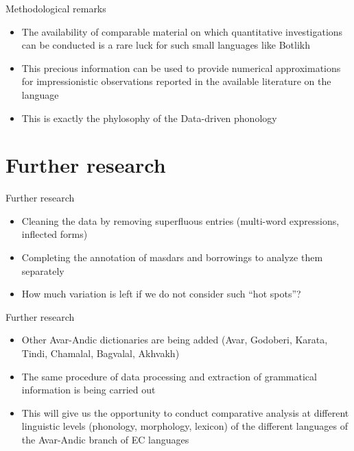 \begin{frame}{Methodological remarks}
\begin{itemize}
    \item The availability of comparable material on which quantitative investigations can be conducted is a rare luck for such small languages like Botlikh
    \item This precious information can be used to provide numerical approximations for impressionistic observations reported in the available literature on the language
    \item This is exactly the phylosophy of the Data-driven phonology
\end{itemize}
\end{frame}

\section{Further research}

\begin{frame}{Further research}
\begin{itemize}
    \item Cleaning the data by removing superfluous entries (multi-word expressions, inflected forms)
    \item Completing the annotation of masdars and borrowings to analyze them separately
    \item How much variation is left if we do not consider such ``hot spots''?
\end{itemize}
\end{frame}

\begin{frame}{Further research}
\begin{itemize}
    \item Other Avar-Andic dictionaries are being added (Avar, Godoberi, Karata, Tindi, Chamalal, Bagvalal, Akhvakh)
    \item The same procedure of data processing and extraction of grammatical information is being carried out
    \item This will give us the opportunity to conduct comparative analysis at different linguistic levels (phonology, morphology, lexicon) of the different languages of the Avar-Andic branch of EC languages
\end{itemize}
\end{frame}

